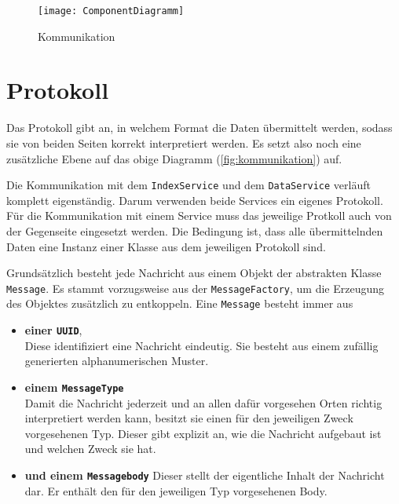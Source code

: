     \begin{figure}[H]
    \centering
    \texttt{[image: ComponentDiagramm]}
    \caption{Kommunikation}
    \label{fig:kommunikation}
    \end{figure}
    


\section{Protokoll}\label{section:protokoll}

Das Protokoll gibt an, in welchem Format die Daten übermittelt werden, sodass sie von beiden Seiten korrekt interpretiert werden. Es setzt also noch eine zusätzliche Ebene auf das obige Diagramm (\autoref{fig:kommunikation}) auf.



Die Kommunikation mit dem \texttt{IndexService} und dem \texttt{DataService} verläuft komplett eigenständig. Darum verwenden beide Services ein eigenes Protokoll. Für die Kommunikation mit einem Service muss das jeweilige Protkoll auch von der Gegenseite eingesetzt werden. Die Bedingung ist, dass alle übermittelnden Daten eine Instanz einer Klasse aus dem jeweiligen Protokoll sind.
    

Grundsätzlich besteht jede Nachricht aus einem Objekt der abstrakten Klasse \texttt{Mes\-sa\-ge}. Es stammt vorzugsweise aus der \texttt{MessageFactory}, um die Erzeugung des Objektes zusätzlich zu entkoppeln. Eine \texttt{Mes\-sa\-ge} besteht immer aus 

\begin{itemize}
    \item \textbf{einer \texttt{UUID}},\\
    Diese identifiziert eine Nachricht eindeutig. Sie besteht aus einem zufällig generierten alphanumerischen Muster.
    \item \textbf{einem \texttt{MessageType}}\\
    Damit die Nachricht jederzeit und an allen dafür vorgesehen Orten richtig interpretiert werden kann, besitzt sie einen für den jeweiligen Zweck vorgesehenen Typ. Dieser gibt explizit an, wie die Nachricht aufgebaut ist und welchen Zweck sie hat.
    \item \textbf{und einem \texttt{Messagebody}}
    Dieser stellt der eigentliche Inhalt der Nachricht dar. Er enthält den für den jeweiligen Typ vorgesehenen Body.
\end{itemize}

